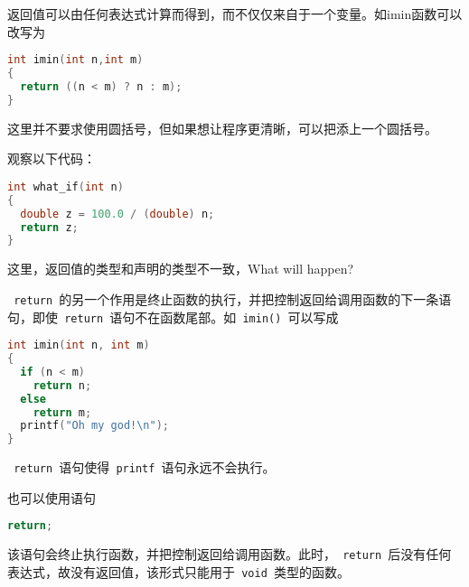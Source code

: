 \begin{frame}[fragile]
返回值可以由任何表达式计算而得到，而不仅仅来自于一个变量。如imin函数可以改写为
\begin{lstlisting}[language=c,backgroundcolor=\color{red!10}]
int imin(int n,int m)
{  
  return ((n < m) ? n : m);
}
\end{lstlisting}
这里并不要求使用圆括号，但如果想让程序更清晰，可以把添上一个圆括号。
\end{frame}

\begin{frame}[fragile]
观察以下代码：
\begin{lstlisting}[language=c,backgroundcolor=\color{red!10}]
int what_if(int n)
{  
  double z = 100.0 / (double) n;
  return z;
}
\end{lstlisting}
这里，返回值的类型和声明的类型不一致，{\Large What will happen?}
\pause 
\vspace{0.1in}


\end{frame}

\begin{frame}[fragile]
\lstinline| return |的另一个作用是终止函数的执行，并把控制返回给调用函数的下一条语句，即使\lstinline| return |语句不在函数尾部。如\lstinline| imin() |可以写成
\begin{lstlisting}[language=c,backgroundcolor=\color{red!10}]
int imin(int n, int m)
{  
  if (n < m)
    return n;
  else
    return m;  
  printf("Oh my god!\n");    
}
\end{lstlisting}
\lstinline| return |语句使得\lstinline| printf |语句永远不会执行。
\end{frame}

\begin{frame}[fragile]
也可以使用语句
\begin{lstlisting}[language=c,backgroundcolor=\color{red!10}]
return;
\end{lstlisting}
该语句会终止执行函数，并把控制返回给调用函数。此时，\lstinline| return |后没有任何表达式，故没有返回值，该形式只能用于\lstinline| void |类型的函数。
\end{frame}


